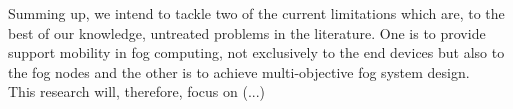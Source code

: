 \noindent\tab Summing up, we intend to tackle two of the current limitations which are, to the best of our knowledge, untreated problems in the literature. One is to provide support mobility in fog computing, not exclusively to the end devices but also to the fog nodes and the other is to achieve multi-objective fog system design.\\
\noindent\tab This research will, therefore, focus on (...)\\
